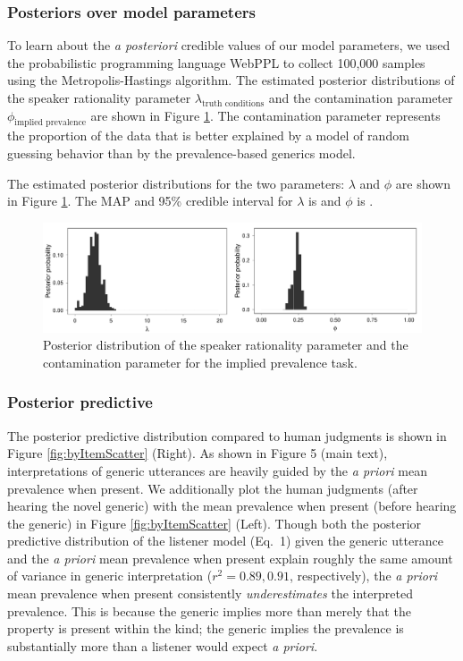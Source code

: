 \documentclass[10pt,letterpaper]{article}
\begin{document}
\subsubsection{Posteriors over model parameters}

To learn about the \emph{a posteriori} credible values of our model parameters, we used the probabilistic programming language WebPPL \cite{dippl} to collect 100,000 samples using the Metropolis-Hastings algorithm. 
The estimated posterior distributions of the speaker rationality parameter $\lambda_\text{truth conditions}$ and the contamination parameter $\phi_{\text{implied prevalence}}$ are shown in Figure \ref{fig:byItemParameters}. 
The contamination parameter represents the proportion of the data that is better explained by a model of random guessing behavior than by the prevalence-based generics model. 

The estimated posterior distributions for the two parameters: $\lambda$ and $\phi$ are shown in Figure \ref{fig:byItemParameters}.
The MAP and 95\% credible interval for $\lambda$ is and $\phi$ is .

\begin{figure}
\centering
    \includegraphics[width=0.8\columnwidth]{asymmetry-byItem-params-2x50k.pdf}
    \caption{Posterior distribution of the speaker rationality parameter and the contamination parameter for the implied prevalence task.}
  \label{fig:byItemParameters}
\end{figure}

\subsubsection{Posterior predictive}

The posterior predictive distribution compared to human judgments is shown in Figure \ref{fig:byItemScatter} (Right). 
As shown in Figure 5 (main text), interpretations of generic utterances are heavily guided by the \emph{a priori} mean prevalence when present. 
We additionally plot the human judgments (after hearing the novel generic) with the mean prevalence when present (before hearing the generic) in Figure \ref{fig:byItemScatter} (Left). 
Though both the posterior predictive distribution of the listener model (Eq.~1) given the generic utterance and the \emph{a priori} mean prevalence when present explain roughly the same amount of variance in generic interpretation ($r^2 = 0.89, 0.91$, respectively), the \emph{a priori} mean prevalence when present consistently \emph{underestimates} the interpreted prevalence.
This is because the generic implies more than merely that the property is present within the kind; the generic implies the prevalence is substantially more than a listener would expect \emph{a priori}. 
\end{document}
